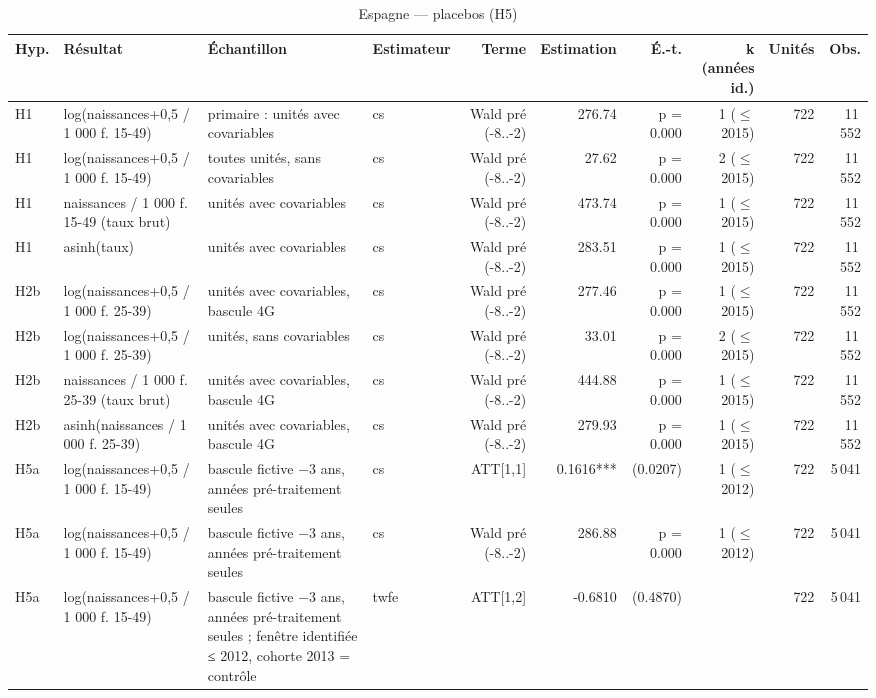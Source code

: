 \begin{table}\centering
\begin{threeparttable}
\caption{Espagne — placebos (H5)}\label{tab:es_placebo}
\scriptsize
\begin{tabular}{lp{4.3cm}p{7.1cm}lrrrrrr}
\toprule
Hyp. & Résultat & Échantillon & Estimateur & Terme & Estimation & É.-t. & k (années id.) & Unités & Obs. \\
\midrule
H1 & log(naissances+0,5 / 1 000 f. 15-49) & primaire : unités avec covariables & cs & Wald pré (-8..-2) & 276.74 & p = 0.000 & 1 ($\leq$ 2015) & 722 & 11\,552 \\
H1 & log(naissances+0,5 / 1 000 f. 15-49) & toutes unités, sans covariables & cs & Wald pré (-8..-2) & 27.62 & p = 0.000 & 2 ($\leq$ 2015) & 722 & 11\,552 \\
H1 & naissances / 1 000 f. 15-49 (taux brut) & unités avec covariables & cs & Wald pré (-8..-2) & 473.74 & p = 0.000 & 1 ($\leq$ 2015) & 722 & 11\,552 \\
H1 & asinh(taux) & unités avec covariables & cs & Wald pré (-8..-2) & 283.51 & p = 0.000 & 1 ($\leq$ 2015) & 722 & 11\,552 \\
H2b & log(naissances+0,5 / 1 000 f. 25-39) & unités avec covariables, bascule 4G & cs & Wald pré (-8..-2) & 277.46 & p = 0.000 & 1 ($\leq$ 2015) & 722 & 11\,552 \\
H2b & log(naissances+0,5 / 1 000 f. 25-39) & unités, sans covariables & cs & Wald pré (-8..-2) & 33.01 & p = 0.000 & 2 ($\leq$ 2015) & 722 & 11\,552 \\
H2b & naissances / 1 000 f. 25-39 (taux brut) & unités avec covariables, bascule 4G & cs & Wald pré (-8..-2) & 444.88 & p = 0.000 & 1 ($\leq$ 2015) & 722 & 11\,552 \\
H2b & asinh(naissances / 1 000 f. 25-39) & unités avec covariables, bascule 4G & cs & Wald pré (-8..-2) & 279.93 & p = 0.000 & 1 ($\leq$ 2015) & 722 & 11\,552 \\
H5a & log(naissances+0,5 / 1 000 f. 15-49) & bascule fictive $-$3 ans, années pré-traitement seules & cs & ATT[1,1] & 0.1616*** & (0.0207) & 1 ($\leq$ 2012) & 722 & 5\,041 \\
H5a & log(naissances+0,5 / 1 000 f. 15-49) & bascule fictive $-$3 ans, années pré-traitement seules & cs & Wald pré (-8..-2) & 286.88 & p = 0.000 & 1 ($\leq$ 2012) & 722 & 5\,041 \\
H5a & log(naissances+0,5 / 1 000 f. 15-49) & bascule fictive $-$3 ans, années pré-traitement seules ; fenêtre identifiée ≤ 2012, cohorte 2013 = contrôle & twfe & ATT[1,2] & -0.6810 & (0.4870) &  & 722 & 5\,041 \\

\end{tabular}
\end{threeparttable}
\end{table}
